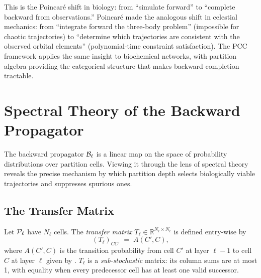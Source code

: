 \begin{remark}
This is the Poincaré shift in biology: from ``simulate forward'' to
``complete backward from observations.''  Poincaré made the analogous shift
in celestial mechanics: from ``integrate forward the three-body problem''
(impossible for chaotic trajectories) to ``determine which trajectories
are consistent with the observed orbital elements'' (polynomial-time
constraint satisfaction).  The PCC framework applies the same insight to
biochemical networks, with partition algebra providing the categorical
structure that makes backward completion tractable.
\end{remark}

\section{Spectral Theory of the Backward Propagator}
\label{sec:ch05-spectral}

The backward propagator $\mathcal{B}_\ell$ is a linear map on the space of
probability distributions over partition cells.  Viewing it through the lens
of spectral theory reveals the precise mechanism by which partition depth
selects biologically viable trajectories and suppresses spurious ones.

\subsection{The Transfer Matrix}

\begin{definition}
\label{def:ch05-transfer-matrix}
Let $\mathcal{P}_\ell$ have $N_\ell$ cells.  The \emph{transfer matrix}
$T_\ell \in \mathbb{R}^{N_\ell \times N_\ell}$ is defined entry-wise by
\begin{equation}
\label{eq:ch05-transfer-def}
    (T_\ell)_{CC'} \;=\; A(C', C),
\end{equation}
where $A(C', C)$ is the transition probability from cell $C'$ at layer
$\ell - 1$ to cell $C$ at layer $\ell$ given by .
$T_\ell$ is a \emph{sub-stochastic} matrix: its column sums are at most 1,
with equality when every predecessor cell has at least one valid successor.
\end{definition}

